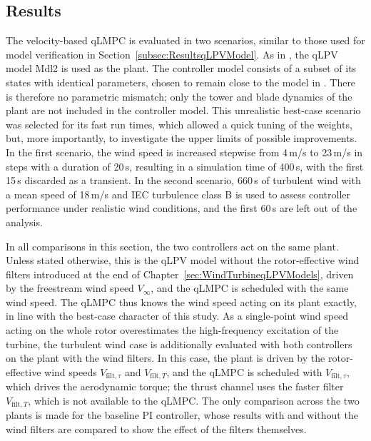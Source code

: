 \subsection{Results} \label{quasiLPVMPCResults}
The velocity-based qLMPC is evaluated in two scenarios, similar to those used for model verification in Section~\ref{subsec:ResultsqLPVModel}. As in \cite{dittmer2021velocity}, the qLPV model Mdl2 is used as the plant. The controller model consists of a subset of its states with identical parameters, chosen to remain close to the model in \cite{Bianchi2007}. There is therefore no parametric mismatch; only the tower and blade dynamics of the plant are not included in the controller model. This unrealistic best-case scenario was selected for its fast run times, which allowed a quick tuning of the weights, but, more importantly, to investigate the upper limits of possible improvements. In the first scenario, the wind speed is increased stepwise from 4\,m/s to 23\,m/s in steps with a duration of 20\,s, resulting in a simulation time of 400\,s, with the first 15\,s discarded as a transient. In the second scenario, 660\,s of turbulent wind with a mean speed of 18\,m/s and IEC turbulence class B is used to assess controller performance under realistic wind conditions, and the first 60\,s are left out of the analysis.

In all comparisons in this section, the two controllers act on the same plant. Unless stated otherwise, this is the qLPV model without the rotor-effective wind filters introduced at the end of Chapter~\ref{sec:WindTurbineqLPVModels}, driven by the freestream wind speed $V_\infty$, and the qLMPC is scheduled with the same wind speed. The qLMPC thus knows the wind speed acting on its plant exactly, in line with the best-case character of this study. As a single-point wind speed acting on the whole rotor overestimates the high-frequency excitation of the turbine, the turbulent wind case is additionally evaluated with both controllers on the plant with the wind filters. In this case, the plant is driven by the rotor-effective wind speeds $V_{\text{filt},\tau}$ and $V_{\text{filt},T}$, and the qLMPC is scheduled with $V_{\text{filt},\tau}$, which drives the aerodynamic torque; the thrust channel uses the faster filter $V_{\text{filt},T}$, which is not available to the qLMPC. The only comparison across the two plants is made for the baseline PI controller, whose results with and without the wind filters are compared to show the effect of the filters themselves.


